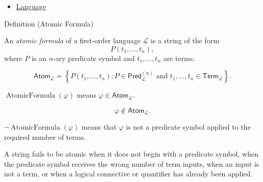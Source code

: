 \begin{dependencies}
\begin{itemize}
  \item \hyperref[def:language]{Language}
\end{itemize}
\end{dependencies}

\begin{definitionbox}{Definition (Atomic Formula)}
\begin{definition}
\label{def:atomic-formula}
An \emph{atomic formula} of a first-order language \(\mathcal L\) is a string
of the form
\[
P(t_1,\ldots,t_n),
\]
where \(P\) is an \(n\)-ary predicate symbol and
\(t_1,\ldots,t_n\) are terms.
\end{definition}
\end{definitionbox}

\begin{remark*}
\[
\mathsf{Atom}_{\mathcal L}
=
\left\{
P(t_1,\ldots,t_n):
P\in\mathsf{Pred}_{\mathcal L}^{(n)}
\text{ and }
t_1,\ldots,t_n\in\mathsf{Term}_{\mathcal L}
\right\}.
\]
\end{remark*}

\begin{remark*}
\(\operatorname{AtomicFormula}(\varphi)\) means
\(\varphi\in\mathsf{Atom}_{\mathcal L}\).
\end{remark*}

\begin{remark*}
\[
\varphi\notin\mathsf{Atom}_{\mathcal L}.
\]
\end{remark*}

\begin{remark*}
\(\neg\operatorname{AtomicFormula}(\varphi)\) means that \(\varphi\) is not a
predicate symbol applied to the required number of terms.
\end{remark*}

\begin{remark*}
A string fails to be atomic when it does not begin with a predicate symbol,
when the predicate symbol receives the wrong number of term inputs, when an
input is not a term, or when a logical connective or quantifier has already
been applied.
\end{remark*}

